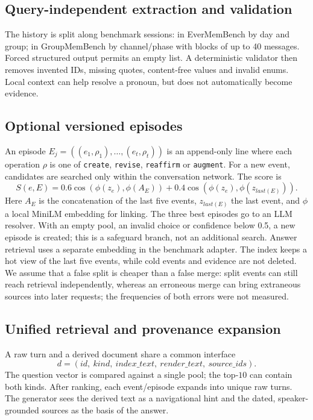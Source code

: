 \documentclass[11pt,a4paper]{article}
\begin{document}
\subsection{Query-independent extraction and validation}

The history is split along benchmark sessions: in EverMemBench by day and group;
in GroupMemBench by channel/phase with blocks of up to 40 messages. Forced
structured output permits an empty list. A deterministic validator then removes
invented IDs, missing quotes, content-free values and invalid enums. Local context
can help resolve a pronoun, but does not automatically become evidence.

\subsection{Optional versioned episodes}

An episode $E_j=((e_1,\rho_1),\ldots,(e_t,\rho_t))$ is an append-only line where each operation $\rho$ is one of \texttt{create},
\texttt{revise}, \texttt{reaffirm} or \texttt{augment}.
For a new event, candidates are searched only within the conversation network. The
score is
\[
S(e,E)=0.6\cos(\phi(z_e),\phi(A_E))+0.4\cos(\phi(z_e),\phi(z_{last(E)})).
\]
Here $A_E$ is the concatenation of the last five events, $z_{last(E)}$ the last
event, and $\phi$ a local MiniLM embedding for linking. The three best episodes go
to an LLM resolver. With an empty pool, an invalid choice or confidence below 0.5,
a new episode is created; this is a safeguard branch, not an additional search.
Answer retrieval uses a separate embedding in the benchmark adapter. The index
keeps a hot view of the last five events, while cold events and evidence are not
deleted. We assume that a false split is cheaper than a false merge: split events
can still reach retrieval independently, whereas an erroneous merge can bring
extraneous sources into later requests; the frequencies of both errors were not
measured.

\subsection{Unified retrieval and provenance expansion}

A raw turn and a derived document share a common interface
\[
d=(id,\ kind,\ index\_text,\ render\_text,\ source\_ids).
\]
The question vector is compared against a single pool; the top-$10$ can contain
both kinds. After ranking, each event/episode expands into unique raw turns. The
generator sees the derived text as a navigational hint and the dated,
speaker-grounded sources as the basis of the answer.
\end{document}
